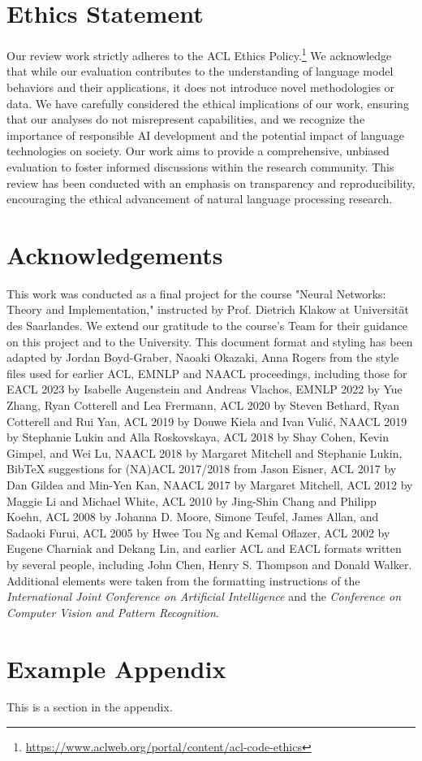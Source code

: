 \documentclass[11pt]{article}
\begin{document}
\section*{Ethics Statement}
Our review work strictly adheres to the ACL Ethics Policy.\footnote{\url{https://www.aclweb.org/portal/content/acl-code-ethics}} We acknowledge that while our evaluation contributes to the understanding of language model behaviors and their applications, it does not introduce novel methodologies or data. We have carefully considered the ethical implications of our work, ensuring that our analyses do not misrepresent capabilities, and we recognize the importance of responsible AI development and the potential impact of language technologies on society. Our work aims to provide a comprehensive, unbiased evaluation to foster informed discussions within the research community. This review has been conducted with an emphasis on transparency and reproducibility, encouraging the ethical advancement of natural language processing research.

\section*{Acknowledgements}
This work was conducted as a final project for the course "Neural Networks: Theory and Implementation," instructed by Prof. Dietrich Klakow at Universität des Saarlandes. We extend our gratitude to the course's Team for their guidance on this project and to the University. This document format and styling has been adapted by Jordan Boyd-Graber, Naoaki Okazaki, Anna Rogers from the style files used for earlier ACL, EMNLP and NAACL proceedings, including those for
EACL 2023 by Isabelle Augenstein and Andreas Vlachos,
EMNLP 2022 by Yue Zhang, Ryan Cotterell and Lea Frermann,
ACL 2020 by Steven Bethard, Ryan Cotterell and Rui Yan,
ACL 2019 by Douwe Kiela and Ivan Vuli\'{c},
NAACL 2019 by Stephanie Lukin and Alla Roskovskaya,
ACL 2018 by Shay Cohen, Kevin Gimpel, and Wei Lu,
NAACL 2018 by Margaret Mitchell and Stephanie Lukin,
Bib\TeX{} suggestions for (NA)ACL 2017/2018 from Jason Eisner,
ACL 2017 by Dan Gildea and Min-Yen Kan, NAACL 2017 by Margaret Mitchell,
ACL 2012 by Maggie Li and Michael White,
ACL 2010 by Jing-Shin Chang and Philipp Koehn,
ACL 2008 by Johanna D. Moore, Simone Teufel, James Allan, and Sadaoki Furui,
ACL 2005 by Hwee Tou Ng and Kemal Oflazer,
ACL 2002 by Eugene Charniak and Dekang Lin,
and earlier ACL and EACL formats written by several people, including
John Chen, Henry S. Thompson and Donald Walker.
Additional elements were taken from the formatting instructions of the \emph{International Joint Conference on Artificial Intelligence} and the \emph{Conference on Computer Vision and Pattern Recognition}.




\appendix

\section{Example Appendix}
\label{sec:appendix}

This is a section in the appendix.
\end{document}
